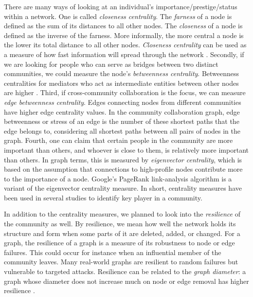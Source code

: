 \documentclass{acm_proc_article-sp}
\begin{document}
There are many ways of looking at an individual's importance/prestige/status within a network. One is called \textit{closeness centrality}. The \textit{farness} of a node is defined as the sum of its distances to all other nodes. The \textit{closeness} of a node is defined as the inverse of the farness. More informally, the more central a node is the lower its total distance to all other nodes. \textit{Closeness centrality} can be used as a measure of how fast information will spread through the network \cite{Chakrabarti}. Secondly, if we are looking for people who can serve as bridges between two distinct communities, we could measure the node's \textit{betweenness centrality}. Betweenness centralities for mediators who act as intermediate entities between other nodes are higher \cite{Chakrabarti}.  Third, if cross-community collaboration is the focus, we can measure \textit{edge betweenness centrality}.  Edges connecting nodes from different communities have higher edge centrality values. In the community collaboration graph, edge betweenness or stress of an edge is the number of these shortest paths that the edge belongs to, considering all shortest paths between all pairs of nodes in the graph. Fourth, one can claim that certain people in the community are more important than others, and whoever is close to them, is relatively more important than others. In graph terms, this is measured by \textit{eigenvector centrality}, which is based on the assumption that connections to high-profile nodes contribute more to the importance of a node. Google's PageRank link-analysis algorithm \cite{Page} is a variant of the eigenvector centrality measure. In short, centrality measures have been used in several studies to identify key player in a community.

In addition to the centrality measures, we planned to look into the \textit{resilience} of the community as well. By resilience, we mean how well the network holds its structure and form when some parts of it are deleted, added, or changed. For a graph, the resilience of a graph is a measure of its robustness to node or edge failures. This could occur for instance when an influential member of the community leaves. Many real-world graphs are resilient to random failures but vulnerable to targeted attacks. Resilience can be related to the \textit{graph diameter}: a graph whose diameter does not increase much on node or edge removal has higher resilience \cite{Chakrabarti}.
\end{document}

